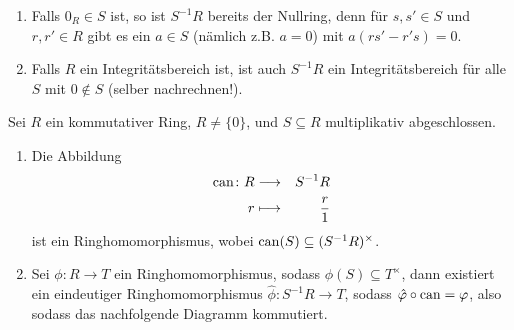 \documentclass[12pt,a4paper]{scrartcl}
\begin{document}
\begin{bem}
	\leavevmode
	\begin{enumerate}
		\item Falls $0_R\in S$ ist, so ist $S^{-1}R$ bereits der Nullring, denn für $s,s'\in S$ und $r,r'\in R$ gibt es ein $a\in S$ (nämlich z.B. $a = 0$) mit  $a(rs'-r's) = 0$.
		\item Falls $R$ ein Integritätsbereich ist, ist auch $S^{-1}R$ ein Integritätsbereich für alle $S$ mit $0\notin S$ (selber nachrechnen!).
	\end{enumerate}
\end{bem}

\begin{satz} \label{thm:unieig_lokali}
	Sei $R$ ein kommutativer Ring, $R\neq\{0\}$, und $S\subseteq R$ multiplikativ abgeschlossen.
	\begin{enumerate}
		\item Die Abbildung
		\begin{eqnarray*}
			\operatorname{can}\colon R & \longrightarrow & S^{-1}R\\
			r & \longmapsto & \frac r1
		\end{eqnarray*}
		ist ein Ringhomomorphismus, wobei $\operatorname{can}(S) \subseteq(S^{-1}R)^{\times}$.
		\item Sei $\phi\colon R\to T$ ein Ringhomomorphismus, sodass $\phi(S) \subseteq T^{\times}$, dann existiert ein eindeutiger Ringhomomorphismus $\hat{\phi}\colon S^{-1}R\to T$, sodass
		$\hat{\varphi}\circ \operatorname{can} = \varphi$, also sodass das nachfolgende Diagramm kommutiert.
		\begin{center}
		\end{center}
	\end{enumerate}
\end{satz}
\end{document}
